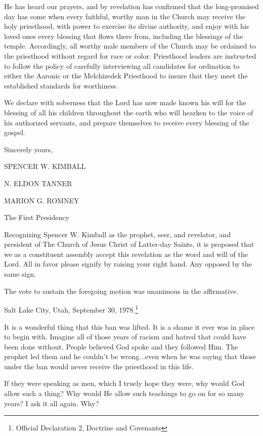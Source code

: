 \documentclass{article}
\begin{document}
\begin{displayquote}
He has heard our prayers, and by revelation has confirmed that the long-promised 
day has come when every faithful, worthy man in the Church may receive the holy 
priesthood, with power to exercise its divine authority, and enjoy with his 
loved ones every blessing that flows there from, including the blessings of the 
temple. Accordingly, all worthy male members of the Church may be ordained to 
the priesthood without regard for race or color. Priesthood leaders are 
instructed to follow the policy of carefully interviewing all candidates for 
ordination to either the Aaronic or the Melchizedek Priesthood to insure that 
they meet the established standards for worthiness.

We declare with soberness that the Lord has now made known his will for the 
blessing of all his children throughout the earth who will hearken to the 
voice of his authorized servants, and prepare themselves to receive every 
blessing of the gospel.

Sincerely yours,

SPENCER W. KIMBALL

N. ELDON TANNER

MARION G. ROMNEY

The First Presidency

Recognizing Spencer W. Kimball as the prophet, seer, and revelator, and 
president of The Church of Jesus Christ of Latter-day Saints, it is proposed 
that we as a constituent assembly accept this revelation as the word and 
will of the Lord. All in favor please signify by raising your right hand. 
Any opposed by the same sign.

The vote to sustain the foregoing motion was unanimous in the affirmative.

Salt Lake City, Utah, September 30, 1978.\footnote{Official Declaration 2, 
Doctrine and Covenants}
\end{displayquote}

It is a wonderful thing that this ban was lifted. It is a shame it ever was in
place to begin with. Imagine all of those years of racism and hatred that could
have been done without. People believed God spoke and they followed Him. The
prophet led them and he couldn't be wrong...even when he was saying that those
under the ban would never receive the priesthood in this life.

If they were speaking as men, which I truely hope they were, why would God allow
such a thing? Why would He allow such teachings to go on for so many years? I 
ask it all again. Why?
\end{document}
